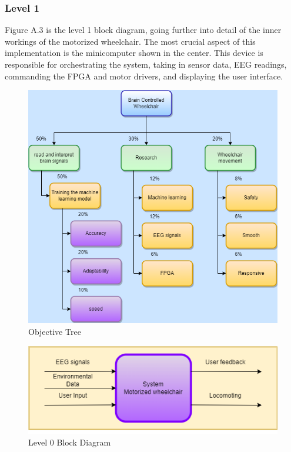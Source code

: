 \documentclass[conference]{IEEEtran}
\begin{document}
        \subsubsection{Level 1}
        Figure A.3 is the level 1 block diagram, going further into detail of  the inner workings of the motorized wheelchair. The most crucial aspect of this implementation is the minicomputer shown in the center. This device is responsible for orchestrating the system, taking in sensor data, EEG readings, commanding the FPGA and motor drivers, and displaying the user interface.  
    \clearpage
    \onecolumn
    \setcounter{figure}{0}
    \renewcommand{\thefigure}{A.\arabic{figure}}
    \begin{figure}
        \centering
        \centerline{\includegraphics{figs/A/Objective_Tree_Figure_A.1.png}}
            \caption{Objective Tree}
            \label{fig:obj-tree}
    \end{figure}
    \begin{figure}
        \centering
        \centerline{\includegraphics{figs/A/Level_0_Block_Diagram_Figure_A.2..png}}
        \caption{Level 0 Block Diagram}
        \label{fig:level-0}
    \end{figure}
\end{document}
